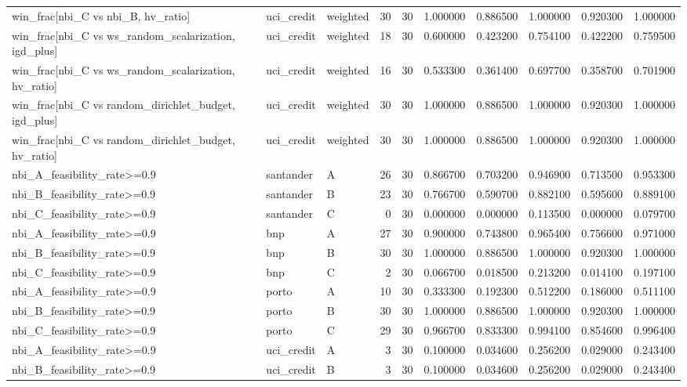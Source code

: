 \begin{longtable}{lllrrrrrrr}
win\_frac[nbi\_C vs nbi\_B, hv\_ratio] & uci\_credit & weighted & 30 & 30 & 1.000000 & 0.886500 & 1.000000 & 0.920300 & 1.000000 \\
win\_frac[nbi\_C vs ws\_random\_scalarization, igd\_plus] & uci\_credit & weighted & 18 & 30 & 0.600000 & 0.423200 & 0.754100 & 0.422200 & 0.759500 \\
win\_frac[nbi\_C vs ws\_random\_scalarization, hv\_ratio] & uci\_credit & weighted & 16 & 30 & 0.533300 & 0.361400 & 0.697700 & 0.358700 & 0.701900 \\
win\_frac[nbi\_C vs random\_dirichlet\_budget, igd\_plus] & uci\_credit & weighted & 30 & 30 & 1.000000 & 0.886500 & 1.000000 & 0.920300 & 1.000000 \\
win\_frac[nbi\_C vs random\_dirichlet\_budget, hv\_ratio] & uci\_credit & weighted & 30 & 30 & 1.000000 & 0.886500 & 1.000000 & 0.920300 & 1.000000 \\
nbi\_A\_feasibility\_rate>=0.9 & santander & A & 26 & 30 & 0.866700 & 0.703200 & 0.946900 & 0.713500 & 0.953300 \\
nbi\_B\_feasibility\_rate>=0.9 & santander & B & 23 & 30 & 0.766700 & 0.590700 & 0.882100 & 0.595600 & 0.889100 \\
nbi\_C\_feasibility\_rate>=0.9 & santander & C & 0 & 30 & 0.000000 & 0.000000 & 0.113500 & 0.000000 & 0.079700 \\
nbi\_A\_feasibility\_rate>=0.9 & bnp & A & 27 & 30 & 0.900000 & 0.743800 & 0.965400 & 0.756600 & 0.971000 \\
nbi\_B\_feasibility\_rate>=0.9 & bnp & B & 30 & 30 & 1.000000 & 0.886500 & 1.000000 & 0.920300 & 1.000000 \\
nbi\_C\_feasibility\_rate>=0.9 & bnp & C & 2 & 30 & 0.066700 & 0.018500 & 0.213200 & 0.014100 & 0.197100 \\
nbi\_A\_feasibility\_rate>=0.9 & porto & A & 10 & 30 & 0.333300 & 0.192300 & 0.512200 & 0.186000 & 0.511100 \\
nbi\_B\_feasibility\_rate>=0.9 & porto & B & 30 & 30 & 1.000000 & 0.886500 & 1.000000 & 0.920300 & 1.000000 \\
nbi\_C\_feasibility\_rate>=0.9 & porto & C & 29 & 30 & 0.966700 & 0.833300 & 0.994100 & 0.854600 & 0.996400 \\
nbi\_A\_feasibility\_rate>=0.9 & uci\_credit & A & 3 & 30 & 0.100000 & 0.034600 & 0.256200 & 0.029000 & 0.243400 \\
nbi\_B\_feasibility\_rate>=0.9 & uci\_credit & B & 3 & 30 & 0.100000 & 0.034600 & 0.256200 & 0.029000 & 0.243400 \\

\end{longtable}
